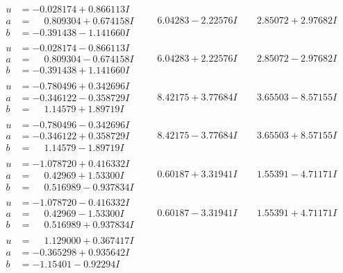 \documentclass[1p]{elsarticle_modified}
\theoremstyle{definition}
\begin{document}
$$\begin{array}{c|c|c}
\begin{aligned}
u &= -0.028174 + 0.866113 I \\
a &= \phantom{-}0.809304 + 0.674158 I \\
b &= -0.391438 - 1.141660 I\end{aligned}
 & \phantom{-}6.04283 - 2.22576 I & \phantom{-}2.85072 + 2.97682 I \\ \hline\begin{aligned}
u &= -0.028174 - 0.866113 I \\
a &= \phantom{-}0.809304 - 0.674158 I \\
b &= -0.391438 + 1.141660 I\end{aligned}
 & \phantom{-}6.04283 + 2.22576 I & \phantom{-}2.85072 - 2.97682 I \\ \hline\begin{aligned}
u &= -0.780496 + 0.342696 I \\
a &= -0.346122 - 0.358729 I \\
b &= \phantom{-}1.14579 + 1.89719 I\end{aligned}
 & \phantom{-}8.42175 + 3.77684 I & \phantom{-}3.65503 - 8.57155 I \\ \hline\begin{aligned}
u &= -0.780496 - 0.342696 I \\
a &= -0.346122 + 0.358729 I \\
b &= \phantom{-}1.14579 - 1.89719 I\end{aligned}
 & \phantom{-}8.42175 - 3.77684 I & \phantom{-}3.65503 + 8.57155 I \\ \hline\begin{aligned}
u &= -1.078720 + 0.416332 I \\
a &= \phantom{-}0.42969 + 1.53300 I \\
b &= \phantom{-}0.516989 - 0.937834 I\end{aligned}
 & \phantom{-}0.60187 + 3.31941 I & \phantom{-}1.55391 - 4.71171 I \\ \hline\begin{aligned}
u &= -1.078720 - 0.416332 I \\
a &= \phantom{-}0.42969 - 1.53300 I \\
b &= \phantom{-}0.516989 + 0.937834 I\end{aligned}
 & \phantom{-}0.60187 - 3.31941 I & \phantom{-}1.55391 + 4.71171 I \\ \hline\begin{aligned}
u &= \phantom{-}1.129000 + 0.367417 I \\
a &= -0.365298 + 0.935642 I \\
b &= -1.15401 - 0.92294 I\end{aligned}

\end{array}$$
\end{document}
